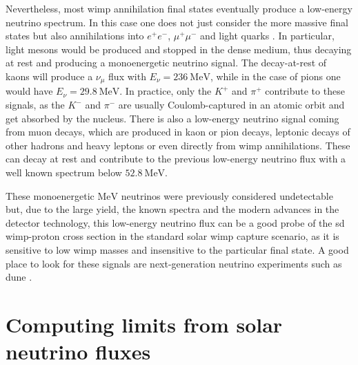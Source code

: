 Nevertheless, most \gls{wimp} annihilation final states eventually produce a low-energy neutrino spectrum.  In this case one does not just consider the more massive final states but also annihilations into $e^{+}e^{-}$, $\mu^{+}\mu^{-}$ and light quarks \cite{Bernal2012}. In particular, light mesons would be produced and stopped in the dense medium, thus decaying at rest and producing a monoenergetic neutrino signal. The decay-at-rest of kaons will produce a $\nu_{\mu}$ flux with $E_{\nu} = 236 ~ \mathrm{MeV}$, while in the case of pions one would have $E_{\nu}  = 29.8 ~ \mathrm{MeV}$. In practice, only the $K^{+}$ and $\pi^{+}$ contribute to these signals, as the $K^{-}$ and $\pi^{-}$ are usually Coulomb-captured in an atomic orbit and get absorbed by the nucleus. There is also a low-energy neutrino signal coming from muon decays, which are produced in kaon or pion decays, leptonic decays of other hadrons and heavy leptons or even directly from \gls{wimp} annihilations. These can decay at rest and contribute to the previous low-energy neutrino flux with a well known spectrum below $52.8 ~ \mathrm{MeV}$.

These monoenergetic $\mathrm{MeV}$ neutrinos were previously considered undetectable but, due to the large yield, the known spectra and the modern advances in the detector technology, this low-energy neutrino flux can be a good probe of the \gls{sd} \gls{wimp}-proton cross section in the standard solar \gls{wimp} capture scenario, as it is sensitive to low \gls{wimp} masses and insensitive to the particular final state. A good place to look for these signals are next-generation neutrino experiments such as \gls{dune} \cite{DUNE2021}.

\section{Computing limits from solar neutrino fluxes}
\label{sec:dm_analysis_limits}

